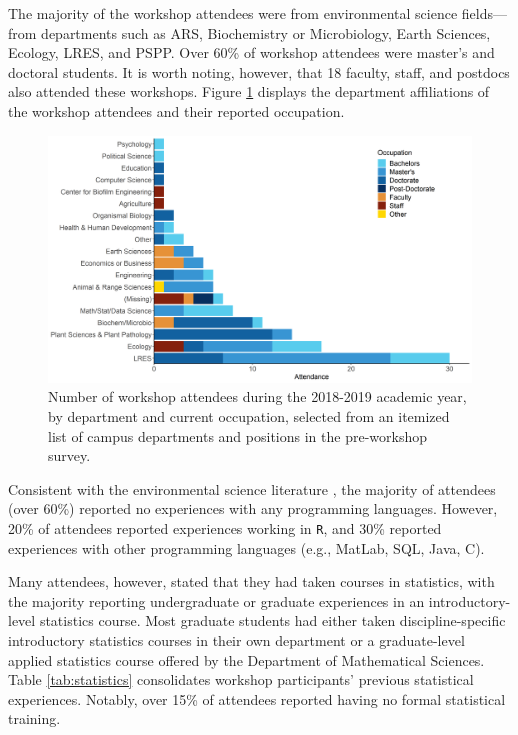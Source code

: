 \documentclass[12pt]{article}
\begin{document}
\noindent The majority of the workshop attendees were from environmental science
fields---from departments such as ARS, Biochemistry or
Microbiology, Earth Sciences, Ecology, LRES, and PSPP. Over 60\% of workshop 
attendees were master's and doctoral students. It is worth noting, however, that
18 faculty, staff, and postdocs also attended these workshops. Figure 
\ref{fig:departments} displays the department affiliations of the workshop
attendees and their reported occupation. 

{
\begin{figure}[h!]
\centering
\includegraphics[width = \textwidth]{images/final_colors_attendance.png}
\caption{Number of workshop attendees during the 2018-2019 academic year, by
department and current occupation, selected from an itemized list of campus
departments and positions in the pre-workshop survey.}
    \label{fig:departments}
\end{figure}
}

\quad Consistent with the environmental science literature \citep{andelman, 
hampton, hernandez, carpentry}, the majority of attendees (over 60\%) reported
no experiences with any programming languages. However, 20\% of attendees 
reported experiences working in \texttt{R}, and 30\% reported experiences with
other programming languages (e.g., MatLab, SQL, Java, C). 

\quad Many attendees, however, stated that they had taken courses in statistics, 
with the majority reporting undergraduate or graduate experiences in an
introductory-level statistics course. Most graduate students had either taken 
discipline-specific introductory statistics courses in their own department or
a graduate-level applied statistics course offered by the Department of
Mathematical Sciences. Table \ref{tab:statistics} consolidates workshop
participants' previous statistical experiences. Notably, over 15\% of
attendees reported having no formal statistical training. 
\end{document}
